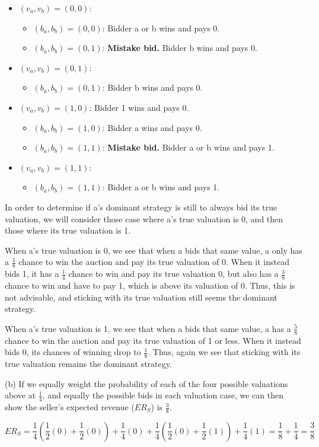 \documentclass[twoside]{article}
\begin{document}
\begin{itemize}
  \item $(v_{a}, v_{b}) = (0, 0)$:
  \begin{itemize}
    \item $(b_{a}, b_{b}) = (0, 0)$: Bidder a or b wins and pays 0.
    \item $(b_{a}, b_{b}) = (0, 1)$: {\bf Mistake bid.} Bidder b wins and pays 0.
  \end{itemize}
  \item $(v_{a}, v_{b}) = (0, 1)$:
  \begin{itemize}
    \item $(b_{a}, b_{b}) = (0, 1)$: Bidder b wins and pays 0.
  \end{itemize}
  \item $(v_{a}, v_{b}) = (1, 0)$: Bidder 1 wins and pays 0.
  \begin{itemize}
    \item $(b_{a}, b_{b}) = (1, 0)$: Bidder a wins and pays 0.
    \item $(b_{a}, b_{b}) = (1, 1)$: {\bf Mistake bid.} Bidder a or b wins and pays 1.
  \end{itemize}
  \item $(v_{a}, v_{b}) = (1, 1)$:
  \begin{itemize}
    \item $(b_{a}, b_{b}) = (1, 1)$: Bidder a or b wins and pays 1.
  \end{itemize}
\end{itemize}

In order to determine if a's dominant strategy is still to always bid its true valuation, we will consider those case where a's true valuation is 0, and then those where its true valuation is 1.

When a's true valuation is 0, we see that when a bids that same value, a only has a $\frac{1}{8}$ chance to win the auction and pay its true valuation of 0. When it instead bids 1, it has a $\frac{1}{4}$ chance to win and pay its true valuation 0, but also has a $\frac{3}{8}$ chance to win and have to pay 1, which is above its valuation of 0. Thus, this is not advisable, and sticking with its true valuation still seems the dominant strategy.

When a's true valuation is 1, we see that when a bids that same value, a has a $\frac{5}{8}$ chance to win the auction and pay its true valuation of 1 or less. When it instead bids 0, its chances of winning drop to $\frac{1}{8}$. Thus, again we see that sticking with its true valuation remains the dominant strategy.

(b) If we equally weight the probability of each of the four possible valuations above at $\frac{1}{4}$, and equally the possible bids in each valuation case, we can then show the seller's expected revenue ($ER_{S}$) is $\frac{3}{8}$.

$$ER_{S} = \frac{1}{4}(\frac{1}{2}(0) + \frac{1}{2}(0)) + \frac{1}{4}(0) + \frac{1}{4}(\frac{1}{2}(0) + \frac{1}{2}(1)) + \frac{1}{4}(1) = \frac{1}{8} + \frac{1}{4} =  \frac{3}{8}$$
\end{document}
